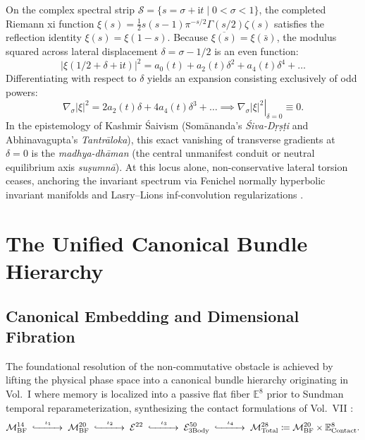 \documentclass[11pt,a4paper,reqno]{article}
\theoremstyle{plain}
\theoremstyle{definition}
\theoremstyle{remark}
\numberwithin{equation}{section}
\numberwithin{table}{section}
\newcommand{\MbfFourteen}{\mathcal{M}_{\mathrm{BF}}^{14}}
\newcommand{\MbfTwenty}{\mathcal{M}_{\mathrm{BF}}^{20}}
\newcommand{\Econtact}{\mathbb{E}_{\mathrm{Contact}}^8}
\newcommand{\Mtotal}{\mathcal{M}_{\mathrm{Total}}^{28}}
\newcommand{\Ebundle}{\mathcal{E}^{22}}
\newcommand{\Ebody}{\mathcal{E}^{50}_{\mathrm{3Body}}}
\begin{document}
On the complex spectral strip $\mathcal{S} = \{s = \sigma + \mathrm{i}t \mid 0 < \sigma < 1\}$, the completed Riemann xi function $\xi(s) = \frac{1}{2}s(s-1)\pi^{-s/2}\Gamma(s/2)\zeta(s)$ satisfies the reflection identity $\xi(s) = \xi(1-s)$. Because $\overline{\xi(s)} = \xi(\bar{s})$, the modulus squared across lateral displacement $\delta = \sigma - 1/2$ is an even function:
\begin{equation}
  |\xi(1/2 + \delta + \mathrm{i}t)|^2 = a_0(t) + a_2(t)\delta^2 + a_4(t)\delta^4 + \dots
\end{equation}
Differentiating with respect to $\delta$ yields an expansion consisting exclusively of odd powers:
\begin{equation}
  \nabla_\sigma |\xi|^2 = 2 a_2(t)\delta + 4 a_4(t)\delta^3 + \dots \implies \left. \nabla_\sigma |\xi|^2 \right|_{\delta = 0} \equiv 0.
\end{equation}
In the epistemology of Kashmir \'{S}aivism (Som\={a}nanda's \emph{\'{S}iva-D\d{r}\d{s}\d{t}i} and Abhinavagupta's \emph{Tantr\={a}loka}), this exact vanishing of transverse gradients at $\delta = 0$ is the \emph{madhya-dh\={a}man} (the central unmanifest conduit or neutral equilibrium axis \emph{su\d{s}umn\={a}}). At this locus alone, non-conservative lateral torsion ceases, anchoring the invariant spectrum via Fenichel normally hyperbolic invariant manifolds \cite{fenichel1979} and Lasry--Lions inf-convolution regularizations \cite{lasry1986}.

\section{The Unified Canonical Bundle Hierarchy}
\label{sec:bundle_hierarchy}

\subsection{Canonical Embedding and Dimensional Fibration}
The foundational resolution of the non-commutative obstacle is achieved by lifting the physical phase space into a canonical bundle hierarchy originating in Vol.~I \cite{PuristVol1Monograph2026} where memory is localized into a passive flat fiber $\mathbb{E}^8$ prior to Sundman temporal reparameterization, synthesizing the contact formulations of Vol.~VII \cite{PuristVol7Monograph2026}:
\begin{equation}
  \MbfFourteen \;\xhookrightarrow{\quad\iota_1\quad}\; \MbfTwenty \;\xhookrightarrow{\quad\iota_2\quad}\; \Ebundle \;\xhookrightarrow{\quad\iota_3\quad}\; \Ebody \;\xhookrightarrow{\quad\iota_4\quad}\; \Mtotal \coloneqq \MbfTwenty \times \Econtact.
  \label{eq:bundle_hierarchy_chain}
\end{equation}
\end{document}
